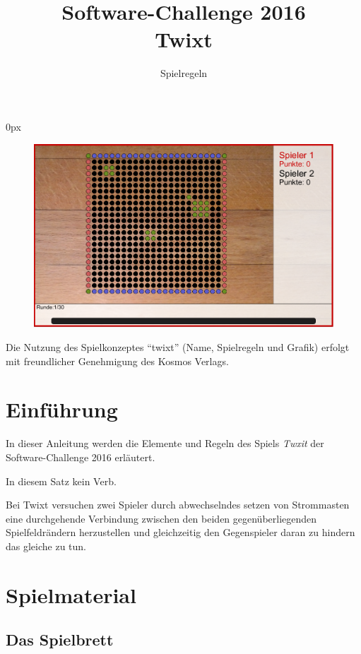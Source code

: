 \documentclass[a4paper, ngerman]{scrartcl}
\title{Software-Challenge 2016 \\ Twixt}
\subtitle{Spielregeln}
\begin{document}
\parindent0px
\maketitle

\begin{figure}[h!]
        \centering
        \includegraphics[width=\linewidth]{bilder/gui.png}
\end{figure}
\vspace*{\fill}

Die Nutzung des Spielkonzeptes "`twixt"' (Name, Spielregeln und Grafik)
erfolgt mit freundlicher Genehmigung des Kosmos Verlags.

\newpage

\tableofcontents

\newpage

\section{Einführung}

In dieser Anleitung werden die Elemente und Regeln des Spiels \emph{Twxit} der
Software-Challenge 2016 erläutert.

In diesem Satz kein Verb.

Bei Twixt versuchen zwei Spieler durch abwechselndes setzen von Strommasten eine
durchgehende Verbindung zwischen den beiden gegenüberliegenden Spielfeldrändern
herzustellen und gleichzeitig den Gegenspieler daran zu hindern das gleiche zu
tun.

\section{Spielmaterial}

\subsection{Das Spielbrett}
\end{document}
